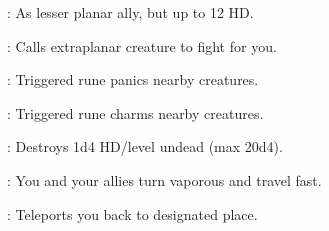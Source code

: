 \begin{multicols}{2}
\begin{description*}
\item[\linkspell{Planar Ally}:] As lesser planar ally, but up to 12 HD.
\item[\linkspell{Summon Monster VI}:] Calls extraplanar creature to fight for you.
\item[\linkspell{Symbol of Fear}:] Triggered rune panics nearby creatures.
\item[\linkspell{Symbol of Persuasion}:] Triggered rune charms nearby creatures.
\item[\linkspell{Undeath to Death}:] Destroys 1d4 HD/level undead (max 20d4).
\item[\linkspell{Wind Walk}:] You and your allies turn vaporous and travel fast.
\item[\linkspell{Word of Recall}:] Teleports you back to designated place.
\end{description*}


\end{multicols}
